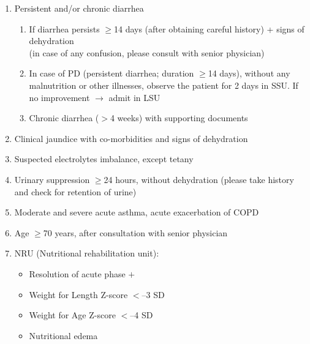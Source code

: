 \documentclass[11pt,a4paper]{report}
\begin{document}
\begin{enumerate}
\begin{enumerate}
\begin{enumerate}
			\item Persistent and/or chronic diarrhea 
			\begin{enumerate}
				\item If diarrhea persists $\geq$14 days (after obtaining careful history) + signs of dehydration \\
				(in case of any confusion, please consult with senior physician)
				\item In case of PD (persistent diarrhea; duration $\geq$14 days), without any malnutrition or other illnesses, observe the patient for 2 days in SSU. If no improvement $\rightarrow$ admit in LSU 
				\item Chronic diarrhea ($>$4 weeks) with supporting documents 
			\end{enumerate}
			\item Clinical jaundice with co-morbidities and signs of dehydration
			\item Suspected electrolytes imbalance, except tetany
			\item Urinary suppression $\geq$24 hours, without dehydration (please take history and check for retention of urine)
			\item Moderate and severe acute asthma, acute exacerbation of COPD 
			\item Age $\geq$70 years, after consultation with senior physician
			\item NRU (Nutritional rehabilitation unit):
			\begin{itemize}
				\item Resolution of acute phase $+$
				\item Weight for Length Z-score $<$--3 SD
				\item Weight for Age Z-score $<$--4 SD
				\item Nutritional edema 
			\end{itemize}
		\end{enumerate}
	\end{enumerate}
\end{enumerate}


\newpage
\end{document}
